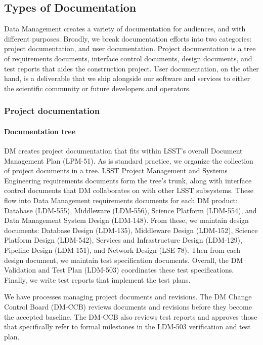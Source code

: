 \subsection{Types of Documentation}

Data Management creates a variety of documentation for audiences, and with different purposes.
Broadly, we break documentation efforts into two categories: project documentation, and user documentation.
Project documentation is a tree of requirements documents, interface control documents, design documents, and test reports that aides the construction project.
User documentation, on the other hand, is a deliverable that we ship alongside our software and services to either the scientific community or future developers and operators.

\subsubsection{Project documentation}

\paragraph{Documentation tree}

DM creates project documentation that fits within LSST's overall Document Management Plan (LPM-51).
As is standard practice, we organize the collection of project documents in a tree.
LSST Project Management and Systems Engineering requirements documents form the tree's trunk, along with interface control documents that DM collaborates on with other LSST subsystems.
These flow into Data Management requirements documents for each DM product: Database (LDM-555), Middleware (LDM-556), Science Platform (LDM-554), and Data Management System Design (LDM-148).
From these, we maintain design documents: Database Design (LDM-135), Middleware Design (LDM-152), Science Platform Design (LDM-542), Services and Infrastructure Design (LDM-129), Pipeline Design (LDM-151), and Network Design (LSE-78).
Then from each design document, we maintain test specification documents.
Overall, the DM Validation and Test Plan (LDM-503) coordinates these test specifications. Finally, we write test reports that implement the test plans.

We have processes managing project documents and revisions.
The DM Change Control Board (DM-CCB) reviews documents and revisions before they become the accepted baseline.
The DM-CCB also reviews test reports and approves those that specifically refer to formal milestones in the LDM-503 verification and test plan.

